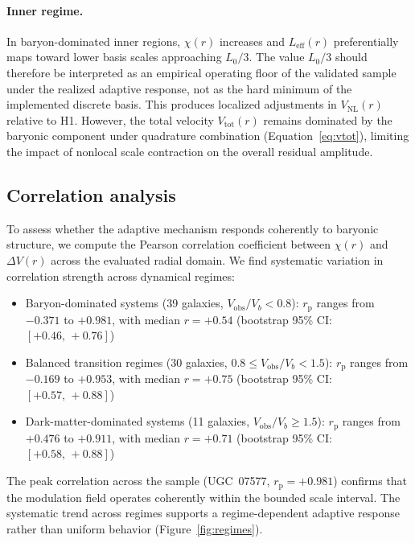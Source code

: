\documentclass[twocolumn,linenumbers]{aastex701}
\newcommand{\Vobs}{V_{\mathrm{obs}}}
\begin{document}
\paragraph{Inner regime.}
In baryon-dominated inner regions, $\chi(r)$ increases and
$L_{\mathrm{eff}}(r)$ preferentially maps toward lower basis scales
approaching $L_0/3$. The value $L_0/3$ should therefore be interpreted
as an empirical operating floor of the validated sample under the realized
adaptive response, not as the hard minimum of the implemented discrete basis.
This produces localized adjustments in $V_{\mathrm{NL}}(r)$ relative to H1.
However, the total velocity $V_{\mathrm{tot}}(r)$ remains dominated by the
baryonic component under quadrature combination (Equation~\ref{eq:vtot}),
limiting the impact of nonlocal scale contraction on the overall residual
amplitude.

\subsection{Correlation analysis}

To assess whether the adaptive mechanism responds coherently to baryonic
structure, we compute the Pearson correlation coefficient between $\chi(r)$
and $\Delta V(r)$ across the evaluated radial domain. We find systematic
variation in correlation strength across dynamical regimes:

\begin{itemize}
	\item Baryon-dominated systems (39 galaxies, $\Vobs/V_b < 0.8$):
	$r_{\mathrm{p}}$ ranges from $-0.371$ to $+0.981$, with median $r = +0.54$
	(bootstrap 95\% CI: $[+0.46,\,+0.76]$)
	\item Balanced transition regimes (30 galaxies, $0.8 \leq \Vobs/V_b < 1.5$):
	$r_{\mathrm{p}}$ ranges from $-0.169$ to $+0.953$, with median $r = +0.75$
	(bootstrap 95\% CI: $[+0.57,\,+0.88]$)
	\item Dark-matter-dominated systems (11 galaxies, $\Vobs/V_b \geq 1.5$):
	$r_{\mathrm{p}}$ ranges from $+0.476$ to $+0.911$, with median $r = +0.71$
	(bootstrap 95\% CI: $[+0.58,\,+0.88]$)
\end{itemize}

The peak correlation across the sample (UGC~07577, $r_{\mathrm{p}} = +0.981$)
confirms that the modulation field operates coherently within the bounded
scale interval. The systematic trend across regimes supports a
regime-dependent adaptive response rather than uniform behavior
(Figure~\ref{fig:regimes}).
\end{document}
